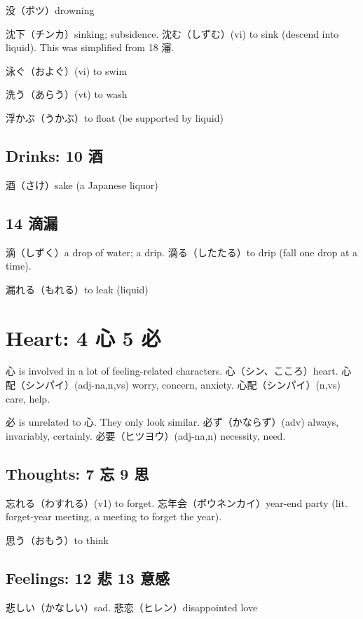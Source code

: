 没（ボツ）drowning

沈下（チンカ）sinking; subsidence.
沈む（しずむ）(vi) to sink (descend into liquid).
This was simplified from 18 瀋.

泳ぐ（およぐ）(vi) to swim

洗う（あらう）(vt) to wash

浮かぶ（うかぶ）to float (be supported by liquid)

\subsection{Drinks: 10 酒}

酒（さけ）sake (a Japanese liquor)

\subsection{14 滴漏}

滴（しずく）a drop of water; a drip.
滴る（したたる）to drip (fall one drop at a time).

漏れる（もれる）to leak (liquid)

\section{Heart: 4 心 5 必}

心 is involved in a lot of feeling-related characters.
心（シン、こころ）heart.
心配（シンパイ）(adj-na,n,vs) worry, concern, anxiety.
心配（シンパイ）(n,vs) care, help.

必 is unrelated to 心. They only look similar.
必ず（かならず）(adv) always, invariably, certainly.
必要（ヒツヨウ）(adj-na,n) necessity, need.

\subsection{Thoughts: 7 忘 9 思}

忘れる（わすれる）(v1) to forget.
忘年会（ボウネンカイ）year-end party
(lit. forget-year meeting, a meeting to forget the year).

思う（おもう）to think

\subsection{Feelings: 12 悲 13 意感}

悲しい（かなしい）sad.
悲恋（ヒレン）disappointed love

